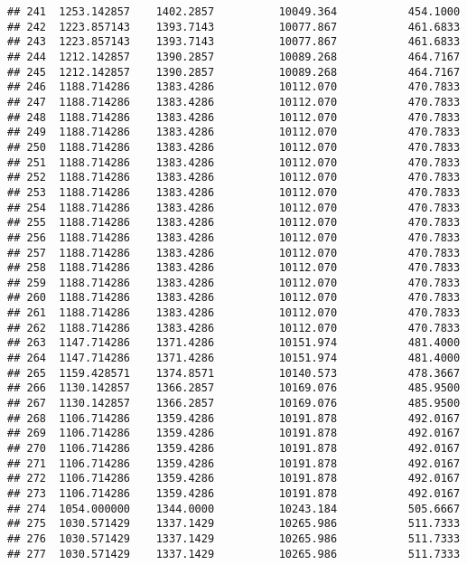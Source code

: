 \documentclass[]{article}
\begin{document}
\begin{verbatim}
## 241  1253.142857    1402.2857          10049.364           454.1000
## 242  1223.857143    1393.7143          10077.867           461.6833
## 243  1223.857143    1393.7143          10077.867           461.6833
## 244  1212.142857    1390.2857          10089.268           464.7167
## 245  1212.142857    1390.2857          10089.268           464.7167
## 246  1188.714286    1383.4286          10112.070           470.7833
## 247  1188.714286    1383.4286          10112.070           470.7833
## 248  1188.714286    1383.4286          10112.070           470.7833
## 249  1188.714286    1383.4286          10112.070           470.7833
## 250  1188.714286    1383.4286          10112.070           470.7833
## 251  1188.714286    1383.4286          10112.070           470.7833
## 252  1188.714286    1383.4286          10112.070           470.7833
## 253  1188.714286    1383.4286          10112.070           470.7833
## 254  1188.714286    1383.4286          10112.070           470.7833
## 255  1188.714286    1383.4286          10112.070           470.7833
## 256  1188.714286    1383.4286          10112.070           470.7833
## 257  1188.714286    1383.4286          10112.070           470.7833
## 258  1188.714286    1383.4286          10112.070           470.7833
## 259  1188.714286    1383.4286          10112.070           470.7833
## 260  1188.714286    1383.4286          10112.070           470.7833
## 261  1188.714286    1383.4286          10112.070           470.7833
## 262  1188.714286    1383.4286          10112.070           470.7833
## 263  1147.714286    1371.4286          10151.974           481.4000
## 264  1147.714286    1371.4286          10151.974           481.4000
## 265  1159.428571    1374.8571          10140.573           478.3667
## 266  1130.142857    1366.2857          10169.076           485.9500
## 267  1130.142857    1366.2857          10169.076           485.9500
## 268  1106.714286    1359.4286          10191.878           492.0167
## 269  1106.714286    1359.4286          10191.878           492.0167
## 270  1106.714286    1359.4286          10191.878           492.0167
## 271  1106.714286    1359.4286          10191.878           492.0167
## 272  1106.714286    1359.4286          10191.878           492.0167
## 273  1106.714286    1359.4286          10191.878           492.0167
## 274  1054.000000    1344.0000          10243.184           505.6667
## 275  1030.571429    1337.1429          10265.986           511.7333
## 276  1030.571429    1337.1429          10265.986           511.7333
## 277  1030.571429    1337.1429          10265.986           511.7333

\end{verbatim}
\end{document}
